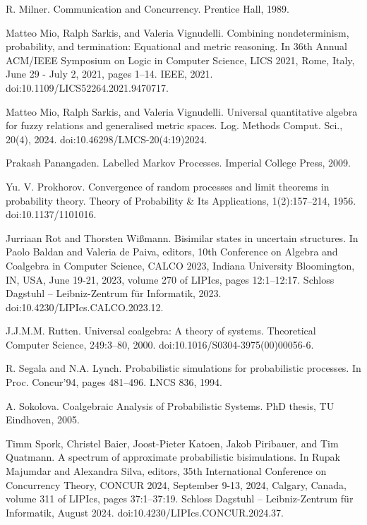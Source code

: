 \par\noindent  [41]  R. Milner.  Communication and Concurrency.  Prentice Hall, 1989.  
 
\par\noindent  [42]  Matteo Mio, Ralph Sarkis, and Valeria Vignudelli.  Combining nondeterminism, probability, and termination: Equational and metric reasoning.  In 36th Annual ACM/IEEE Symposium on Logic in Computer Science, LICS 2021, Rome, Italy, June 29 - July 2, 2021, pages 1–14. IEEE, 2021.  doi:10.1109/LICS52264.2021.9470717.  
 
\par\noindent  [43]  Matteo Mio, Ralph Sarkis, and Valeria Vignudelli.  Universal quantitative algebra for fuzzy relations and generalised metric spaces.  Log. Methods Comput. Sci., 20(4), 2024.  doi:10.46298/LMCS-20(4:19)2024.  
 
\par\noindent  [44]  Prakash Panangaden.  Labelled Markov Processes.  Imperial College Press, 2009.  
 
\par\noindent  [45]  Yu. V. Prokhorov.  Convergence of random processes and limit theorems in probability theory.  Theory of Probability \& Its Applications, 1(2):157–214, 1956.  doi:10.1137/1101016.  
 
\par\noindent  [46]  Jurriaan Rot and Thorsten Wißmann.  Bisimilar states in uncertain structures.  In Paolo Baldan and Valeria de Paiva, editors, 10th Conference on Algebra and Coalgebra in Computer Science, CALCO 2023, Indiana University Bloomington, IN, USA, June 19-21, 2023, volume 270 of LIPIcs, pages 12:1–12:17. Schloss Dagstuhl – Leibniz-Zentrum für Informatik, 2023.  doi:10.4230/LIPIcs.CALCO.2023.12.  
 
\par\noindent  [47]  J.J.M.M. Rutten.  Universal coalgebra: A theory of systems.  Theoretical Computer Science, 249:3–80, 2000.  doi:10.1016/S0304-3975(00)00056-6.  
 
\par\noindent  [48]  R. Segala and N.A. Lynch.  Probabilistic simulations for probabilistic processes.  In Proc. Concur’94, pages 481–496. LNCS 836, 1994.  
 
\par\noindent  [49]  A. Sokolova.  Coalgebraic Analysis of Probabilistic Systems.  PhD thesis, TU Eindhoven, 2005.  
 
\par\noindent  [50]  Timm Spork, Christel Baier, Joost-Pieter Katoen, Jakob Piribauer, and Tim Quatmann.  A spectrum of approximate probabilistic bisimulations.  In Rupak Majumdar and Alexandra Silva, editors, 35th International Conference on Concurrency Theory, CONCUR 2024, September 9-13, 2024, Calgary, Canada, volume 311 of LIPIcs, pages 37:1–37:19. Schloss Dagstuhl – Leibniz-Zentrum für Informatik, August 2024.  doi:10.4230/LIPIcs.CONCUR.2024.37.  
 
